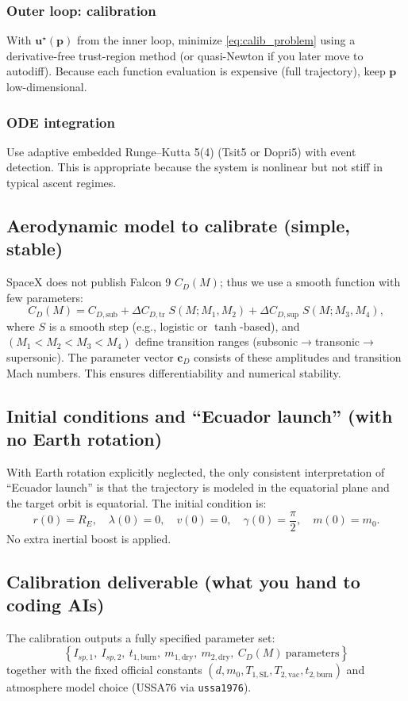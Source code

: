 \documentclass[11pt]{article}
\begin{document}
\subsubsection{Outer loop: calibration}
With $\bm{u}^\star(\bm{p})$ from the inner loop, minimize \eqref{eq:calib_problem} using a derivative-free trust-region method (or quasi-Newton if you later move to autodiff). Because each function evaluation is expensive (full trajectory), keep $\bm{p}$ low-dimensional.

\subsubsection{ODE integration}
Use adaptive embedded Runge--Kutta 5(4) (Tsit5 or Dopri5) with event detection. This is appropriate because the system is nonlinear but not stiff in typical ascent regimes.

\subsection{Aerodynamic model to calibrate (simple, stable)}
\label{sec:cdmodel}
SpaceX does not publish Falcon 9 $C_D(M)$; thus we use a smooth function with few parameters:
\begin{equation}\label{eq:cd_smooth}
C_D(M)=C_{D,\text{sub}} 
+ \Delta C_{D,\text{tr}}\;S(M;M_1,M_2)
+ \Delta C_{D,\text{sup}}\;S(M;M_3,M_4),
\end{equation}
where $S$ is a smooth step (e.g., logistic or $\tanh$-based), and $(M_1<M_2<M_3<M_4)$ define transition ranges (subsonic$\rightarrow$transonic$\rightarrow$supersonic). The parameter vector $\bm{c}_D$ consists of these amplitudes and transition Mach numbers. This ensures differentiability and numerical stability.

\subsection{Initial conditions and ``Ecuador launch'' (with no Earth rotation)}
With Earth rotation explicitly neglected, the only consistent interpretation of ``Ecuador launch'' is that the trajectory is modeled in the equatorial plane and the target orbit is equatorial. The initial condition is:
\[
r(0)=R_E,\quad \lambda(0)=0,\quad v(0)=0,\quad \gamma(0)=\frac{\pi}{2},\quad m(0)=m_0.
\]
No extra inertial boost is applied.

\subsection{Calibration deliverable (what you hand to coding AIs)}
The calibration outputs a fully specified parameter set:
\[
\boxed{
\left\{
I_{sp,1},\ I_{sp,2},\ t_{1,\text{burn}},\ 
m_{1,\text{dry}},\ m_{2,\text{dry}},\ 
C_D(M)\ \text{parameters}
\right\}
}
\]
together with the fixed official constants $(d,m_0,T_{1,\text{SL}},T_{2,\text{vac}},t_{2,\text{burn}})$ and atmosphere model choice (USSA76 via \texttt{ussa1976}).
\end{document}
